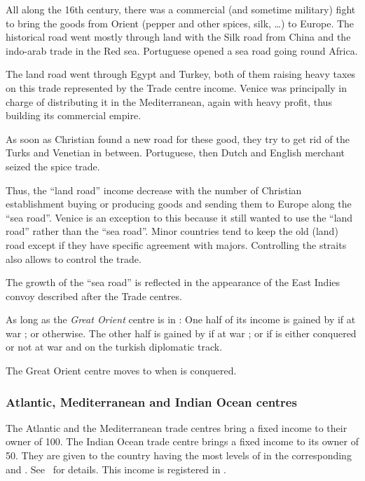 \begin{histoire}
  All along the 16th century, there was a commercial (and sometime
  military) fight to bring the goods from Orient (pepper and other
  spices, silk, \ldots) to Europe. The historical road went mostly
  through land with the Silk road from China and the indo-arab trade in
  the Red sea. Portuguese opened a sea road going round Africa.

  The land road went through Egypt and Turkey, both of them raising
  heavy taxes on this trade represented by the Trade centre
  income. Venice was principally in charge of distributing it in the
  Mediterranean, again with heavy profit, thus building its commercial
  empire.

  As soon as Christian found a new road for these good, they try to get
  rid of the Turks and Venetian in between. Portuguese, then Dutch and
  English merchant seized the spice trade.

  Thus, the ``land road'' income decrease with the number of Christian
  establishment buying or producing goods and sending them to Europe
  along the ``sea road''. Venice is an exception to this because it
  still wanted to use the ``land road'' rather than the ``sea
  road''. Minor countries tend to keep the old (land) road except if
  they have specific agreement with majors. Controlling the straits also
  allows to control the trade.

  The growth of the ``sea road'' is reflected in the appearance of the
  East Indies convoy described after the Trade centres.
\end{histoire}

\aparag As long as the \emph{Great Orient} centre is in :
\bparag One half of its income is gained by \paysEgypte if at war ; or \VEN
otherwise.
\bparag The other half is gained by \paysDamas if at war ; or \TUR if
\paysDamas is either conquered or not at war and on the turkish
diplomatic track.

\aparag The Great Orient centre moves to \TUR when \paysEgypte is
conquered. 

\subsubsection{Atlantic, Mediterranean and Indian Ocean centres}\label{chIncomes:Trade Centres}
\aparag The Atlantic and the Mediterranean trade centres bring a fixed
income to their owner of 100\ducats.
\bparag The Indian Ocean trade centre brings a fixed income to its owner
of 50\ducats.
\bparag They are given to the country having the most levels of
\TradeFLEET in the corresponding \STZ and \CTZ.
See~ for details.
\bparag This income is registered in .


